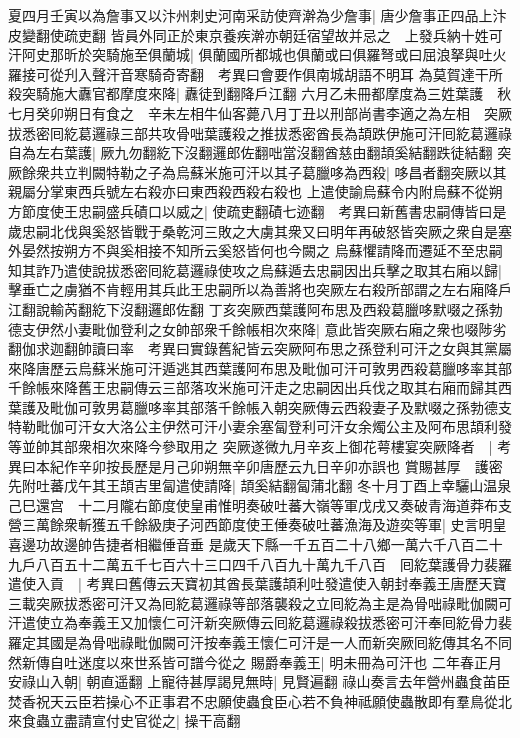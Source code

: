夏四月壬寅以為詹事又以汴州刺史河南采訪使齊澣為少詹事|{
	唐少詹事正四品上汴皮變翻使疏吏翻}
皆員外同正於東京養疾澣亦朝廷宿望故并忌之　上發兵納十姓可汗阿史那昕於突騎施至俱蘭城|{
	俱蘭國所都城也俱蘭或曰俱羅弩或曰屈浪拏與吐火羅接可從刋入聲汗音寒騎奇寄翻　考異曰會要作俱南城胡語不明耳}
為莫賀達干所殺突騎施大纛官都摩度來降|{
	纛徒到翻降戶江翻}
六月乙未冊都摩度為三姓葉護　秋七月癸卯朔日有食之　辛未左相牛仙客薨八月丁丑以刑部尚書李適之為左相　突厥拔悉密囘紇葛邏祿三部共攻骨咄葉護殺之推拔悉密酋長為頡跌伊施可汗囘紇葛邏祿自為左右葉護|{
	厥九勿翻紇下沒翻邏郎佐翻咄當沒翻酋慈由翻頡奚結翻跌徒結翻}
突厥餘衆共立判闕特勒之子為烏蘇米施可汗以其子葛臘哆為西殺|{
	哆昌者翻突厥以其親屬分掌東西兵號左右殺亦曰東西殺西殺右殺也}
上遣使諭烏蘇令内附烏蘇不從朔方節度使王忠嗣盛兵磧口以威之|{
	使疏吏翻磧七迹翻　考異曰新舊書忠嗣傳皆曰是歲忠嗣北伐與奚怒皆戰于桑乾河三敗之大虜其衆又曰明年再破怒皆突厥之衆自是塞外晏然按朔方不與奚相接不知所云奚怒皆何也今闕之}
烏蘇懼請降而遷延不至忠嗣知其詐乃遣使說拔悉密囘紇葛邏祿使攻之烏蘇遁去忠嗣因出兵擊之取其右廂以歸|{
	擊垂亡之虜猶不肯輕用其兵此王忠嗣所以為善將也突厥左右殺所部謂之左右廂降戶江翻說輸芮翻紇下沒翻邏郎佐翻}
丁亥突厥西葉護阿布思及西殺葛臘哆默啜之孫勃德支伊然小妻毗伽登利之女帥部衆千餘帳相次來降|{
	意此皆突厥右廂之衆也啜陟劣翻伽求迦翻帥讀曰率　考異曰實錄舊紀皆云突厥阿布思之孫登利可汗之女與其黨屬來降唐歷云烏蘇米施可汗遁逃其西葉護阿布思及毗伽可汗可敦男西殺葛臘哆率其部千餘帳來降舊王忠嗣傳云三部落攻米施可汗走之忠嗣因出兵伐之取其右廂而歸其西葉護及毗伽可敦男葛臘哆率其部落千餘帳入朝突厥傳云西殺妻子及默啜之孫勃德支特勒毗伽可汗女大洛公主伊然可汗小妻余塞匐登利可汗女余燭公主及阿布思頡利發等並帥其部衆相次來降今參取用之}
突厥遂微九月辛亥上御花萼樓宴突厥降者　|{
	考異曰本紀作辛卯按長歷是月己卯朔無辛卯唐歷云九日辛卯亦誤也}
賞賜甚厚　護密先附吐蕃戊午其王頡吉里匐遣使請降|{
	頡奚結翻匐蒲北翻}
冬十月丁酉上幸驪山温泉己巳還宫　十二月隴右節度使皇甫惟明奏破吐蕃大嶺等軍戊戌又奏破青海道莽布支營三萬餘衆斬獲五千餘級庚子河西節度使王倕奏破吐蕃漁海及遊奕等軍|{
	史言明皇喜邊功故邊帥告捷者相繼倕音垂}
是歲天下縣一千五百二十八鄉一萬六千八百二十九戶八百五十二萬五千七百六十三口四千八百九十萬九千八百　囘紇葉護骨力裴羅遣使入貢　|{
	考異曰舊傳云天寶初其酋長葉護頡利吐發遣使入朝封奉義王唐歷天寶三載突厥拔悉密可汗又為囘紇葛邏祿等部落襲殺之立囘紇為主是為骨咄祿毗伽闕可汗遣使立為奉義王又加懷仁可汗新突厥傳云囘紇葛邏祿殺拔悉密可汗奉囘紇骨力裴羅定其國是為骨咄祿毗伽闕可汗按奉義王懷仁可汗是一人而新突厥囘紇傳其名不同然新傳自吐迷度以來世系皆可譜今從之}
賜爵奉義王|{
	明未冊為可汗也}
二年春正月安祿山入朝|{
	朝直遥翻}
上寵待甚厚謁見無時|{
	見賢遍翻}
祿山奏言去年營州蟲食苖臣焚香祝天云臣若操心不正事君不忠願使蟲食臣心若不負神祗願使蟲散即有羣鳥從北來食蟲立盡請宣付史官從之|{
	操干高翻}
